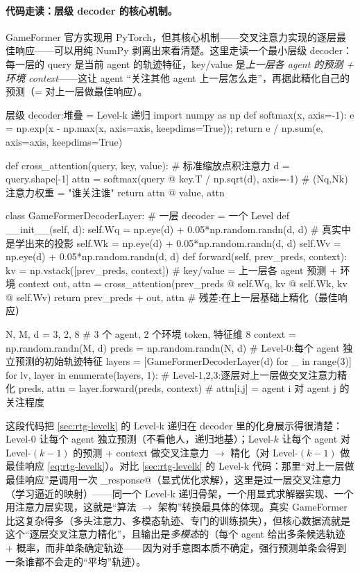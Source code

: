 \paragraph{代码走读：层级 decoder 的核心机制。}
GameFormer 官方实现用 PyTorch，但其核心机制——交叉注意力实现的逐层最佳响应——可以用纯 NumPy 剥离出来看清楚。这里走读一个最小层级 decoder：每一层的 query 是当前 agent 的轨迹特征，key/value 是\emph{上一层各 agent 的预测 + 环境 context}——这让 agent “关注其他 agent 上一层怎么走”，再据此精化自己的预测（= 对上一层做最佳响应）。

\begin{codebox}[Python]{层级 decoder:堆叠 = Level-k 递归}
import numpy as np
def softmax(x, axis=-1):
    e = np.exp(x - np.max(x, axis=axis, keepdims=True)); return e / np.sum(e, axis=axis, keepdims=True)

def cross_attention(query, key, value):            # 标准缩放点积注意力
    d = query.shape[-1]
    attn = softmax(query @ key.T / np.sqrt(d), axis=-1)   # (Nq,Nk) 注意力权重 = "谁关注谁"
    return attn @ value, attn

class GameFormerDecoderLayer:                       # 一层 decoder = 一个 Level
    def __init__(self, d):
        self.Wq = np.eye(d) + 0.05*np.random.randn(d, d)   # 真实中是学出来的投影
        self.Wk = np.eye(d) + 0.05*np.random.randn(d, d)
        self.Wv = np.eye(d) + 0.05*np.random.randn(d, d)
    def forward(self, prev_preds, context):
        kv = np.vstack([prev_preds, context])      # key/value = 上一层各 agent 预测 + 环境 context
        out, attn = cross_attention(prev_preds @ self.Wq, kv @ self.Wk, kv @ self.Wv)
        return prev_preds + out, attn              # 残差:在上一层基础上精化（最佳响应）

N, M, d = 3, 2, 8                                   # 3 个 agent, 2 个环境 token, 特征维 8
context = np.random.randn(M, d)
preds = np.random.randn(N, d)                       # Level-0:每个 agent 独立预测的初始轨迹特征
layers = [GameFormerDecoderLayer(d) for _ in range(3)]
for lv, layer in enumerate(layers, 1):             # Level-1,2,3:逐层对上一层做交叉注意力精化
    preds, attn = layer.forward(preds, context)    # attn[i,j] = agent i 对 agent j 的关注程度
\end{codebox}

\noindent 这段代码把 \cref{sec:rtg-levelk} 的 Level-k 递归在 decoder 里的化身展示得很清楚：Level-0 让每个 agent 独立预测（不看他人，递归地基）；Level-$k$ 让每个 agent 对 Level-$(k-1)$ 的预测 + context 做交叉注意力 $\to$ 精化（对 Level-$(k-1)$ 做最佳响应 \cref{eq:rtg-levelk}）。对比 \cref{sec:rtg-levelk} 的 Level-k 代码：那里“对上一层做最佳响应”是调用一次 \verb@best_response@（显式优化求解），这里是过一层交叉注意力（学习逼近的映射）——同一个 Level-k 递归骨架，一个用显式求解器实现、一个用注意力层实现，这就是“算法 $\to$ 架构”转换最具体的体现。真实 GameFormer 比这复杂得多（多头注意力、多模态轨迹、专门的训练损失），但核心数据流就是这个“逐层交叉注意力精化”，且输出是\emph{多模态}的（每个 agent 给出多条候选轨迹 + 概率，而非单条确定轨迹——因为对手意图本质不确定，强行预测单条会得到一条谁都不会走的“平均”轨迹）。

